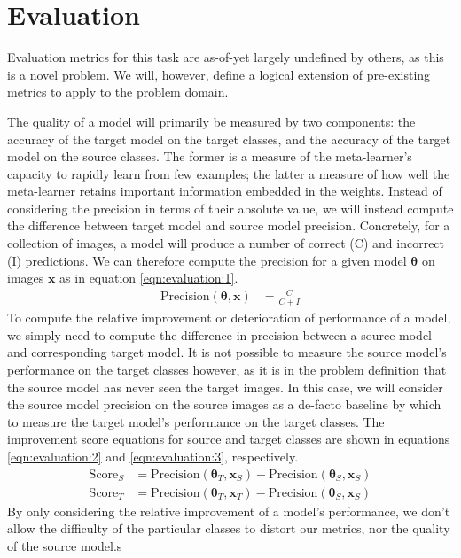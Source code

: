 \documentclass{report}
\begin{document}
	\section{Evaluation}
	Evaluation metrics for this task are as-of-yet largely undefined by others, as this is a novel problem. We will, however, define a logical extension of pre-existing metrics to apply to the problem domain. \par
	The quality of a model will primarily be measured by two components: the accuracy of the target model on the target classes, and the accuracy of the target model on the source classes. The former is a measure of the meta-learner's capacity to rapidly learn from few examples; the latter a measure of how well the meta-learner retains important information embedded in the weights. Instead of considering the precision in terms of their absolute value, we will instead compute the difference between target model and source model precision. Concretely, for a collection of images, a model will produce a number of correct (C) and incorrect (I) predictions. We can therefore compute the precision for a given model $\bm{\theta}$ on images $\bm{x}$ as in equation \ref{eqn:evaluation:1}.
	\begin{align} \label{eqn:evaluation:1}
	\text{Precision}(\bm{\theta}, \bm{x}) &= \frac{C}{C+I}
	\end{align}
	To compute the relative improvement or deterioration of performance of a model, we simply need to compute the difference in precision between a source model and corresponding target model. It is not possible to measure the source model's performance on the target classes however, as it is in the problem definition that the source model has never seen the target images. In this case, we will consider the source model precision on the source images as a de-facto baseline by which to measure the target model's performance on the target classes. The improvement score equations for source and target classes are shown in equations \ref{eqn:evaluation:2} and \ref{eqn:evaluation:3}, respectively.
	\begin{align} \label{eqn:evaluation:2}
	\text{Score}_S &= \text{Precision}(\bm{\theta}_T, \bm{x}_S) - \text{Precision}(\bm{\theta}_S, \bm{x}_S) \\
	\label{eqn:evaluation:3}
	\text{Score}_T &= \text{Precision}(\bm{\theta}_T, \bm{x}_T) - \text{Precision}(\bm{\theta}_S, \bm{x}_S)
	\end{align}
	By only considering the relative improvement of a model's performance, we don't allow the difficulty of the particular classes to distort our metrics, nor the quality of the source model.s
	
\end{document}
